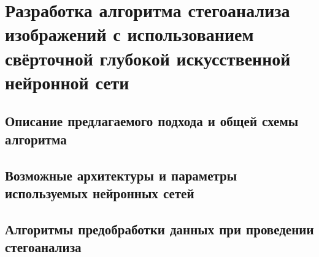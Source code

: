 
\section{Разработка алгоритма стегоанализа изображений с использованием свёрточной глубокой искусственной нейронной сети}

\subsection{Описание предлагаемого подхода и общей схемы алгоритма}
\subsection{Возможные архитектуры и параметры используемых нейронных сетей}

\subsection{Алгоритмы предобработки данных при проведении стегоанализа}

\clearpage
